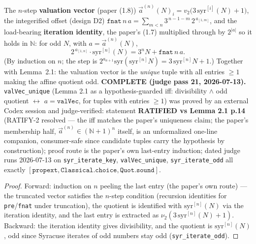 \begin{lemma}\label{C2}
  \leanok
The \(n\)-step \textbf{valuation vector} (paper (1.8))
\(\vec a^{(n)}(N)_i = v_2\bigl(3\,\mathrm{syr}^{[i]}(N)+1\bigr)\), the integerified offset
(design D2) \(\texttt{fnat}\,n\,a = \sum_{m<n} 3^{\,n-1-m}\,2^{\,a_{[1,m]}}\), and the
load-bearing \textbf{iteration identity}, the paper's (1.7) multiplied through by \(2^{|a|}\)
so it holds in \(\mathbb{N}\): for odd \(N\), with \(a=\vec a^{(n)}(N)\),
\[
  2^{\,a_{[1,n]}}\cdot \mathrm{syr}^{[n]}(N) = 3^n N + \texttt{fnat}\,n\,a .
\]
(By induction on \(n\); the step is \(2^{a_{n+1}}\mathrm{syr}(\mathrm{syr}^{[n]}N)
= 3\,\mathrm{syr}^{[n]}N + 1\).)  Together with Lemma~2.1: the valuation vector is the
\emph{unique} tuple with all entries \(\ge 1\) making the affine quotient odd.
\textbf{COMPLETE (judge pass 21, 2026-07-13).}  \texttt{valVec\_unique} (Lemma 2.1 as a
hypothesis-guarded iff: divisibility \(\wedge\) odd quotient \(\leftrightarrow\)
\(a = \texttt{valVec}\), for tuples with entries \(\ge 1\)) was proved by an external
Codex session and judge-verified: statement \textbf{RATIFIED vs Lemma 2.1 p.14}
(RATIFY-2 resolved --- the iff matches the paper's uniqueness claim; the paper's
membership half, \(\vec a^{(n)} \in (\mathbb{N}+1)^n\) itself, is an unformalized
one-line companion, consumer-safe since candidate tuples carry the hypothesis by
construction); proof route is the paper's own last-entry induction; dated judge runs
2026-07-13 on \texttt{syr\_iterate\_key}, \texttt{valVec\_unique},
\texttt{syr\_iterate\_odd} all exactly
\([\texttt{propext}, \texttt{Classical.choice}, \texttt{Quot.sound}]\).
\end{lemma}
\begin{proof}
  \leanok
  Forward: induction on \(n\) peeling the last entry (the paper's own route) --- the
  truncated vector satisfies the \(n\)-step condition (recursion identities for
  \texttt{pre}/\texttt{fnat} under truncation), the quotient is identified with
  \(\mathrm{syr}^{[n]}(N)\) via the iteration identity, and the last entry is extracted
  as \(\nu_2(3\,\mathrm{syr}^{[n]}(N)+1)\).  Backward: the iteration identity gives
  divisibility, and the quotient is \(\mathrm{syr}^{[n]}(N)\), odd since Syracuse
  iterates of odd numbers stay odd (\texttt{syr\_iterate\_odd}).
\end{proof}

